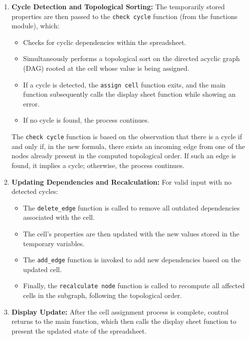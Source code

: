 \documentclass[a4paper,12pt,oneside]{article}
\begin{document}
\begin{enumerate}
    \item \textbf{Cycle Detection and Topological Sorting:}  
    The temporarily stored properties are then passed to the \texttt{check cycle} function (from the functions module), which:
    \begin{itemize}
        \item Checks for cyclic dependencies within the spreadsheet.
        \item Simultaneously performs a topological sort on the directed acyclic graph (DAG) rooted at the cell whose value is being assigned.
    \end{itemize}
    \begin{itemize}
        \item If a cycle is detected, the \texttt{assign cell} function exits, and the main function subsequently calls the display sheet function while showing an error.
        \item If no cycle is found, the process continues.
    \end{itemize}
    The \texttt{check cycle} function is based on the observation that there is a cycle if and only if, in the new formula, there exists an incoming edge from one of the nodes already present in the computed topological order. If such an edge is found, it implies a cycle; otherwise, the process continues.


    \item \textbf{Updating Dependencies and Recalculation:}  
    For valid input with no detected cycles:
    \begin{itemize}
        \item The \texttt{delete\_edge} function is called to remove all outdated dependencies associated with the cell.
        \item The cell’s properties are then updated with the new values stored in the temporary variables.
        \item The \texttt{add\_edge} function is invoked to add new dependencies based on the updated cell.
        \item Finally, the \texttt{recalculate node} function is called to recompute all affected cells in the subgraph, following the topological order.
    \end{itemize}

    \item \textbf{Display Update:}  
    After the cell assignment process is complete, control returns to the main function, which then calls the display sheet function to present the updated state of the spreadsheet.
\end{enumerate}
\end{document}
